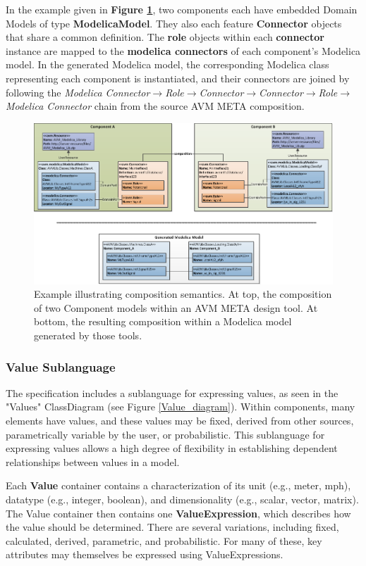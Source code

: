 In the example given in \textbf{Figure \ref{Composition_Example}}, two components each have embedded Domain Models of type \textbf{ModelicaModel}. They also each feature \textbf{Connector} objects that share a common definition. The \textbf{role} objects within each \textbf{connector} instance are mapped to the \textbf{modelica connectors} of each component's Modelica model. In the generated Modelica model, the corresponding Modelica class representing each component is instantiated, and their connectors are joined by following the \textit{ Modelica Connector$\rightarrow$Role$\rightarrow$Connector$\rightarrow$Connector$\rightarrow$Role$\rightarrow$Modelica Connector} chain from the source AVM META composition.

\begin{figure}
\includegraphics[width=\textwidth]{CompositionExample}
\caption{Example illustrating composition semantics. At top, the composition of two Component models within an AVM META design tool. At bottom, the resulting composition within a Modelica model generated by those tools.}
\label{Composition_Example}
\end{figure}

\subsubsection{Value Sublanguage}
The specification includes a sublanguage for expressing values, as seen in the "Values" ClassDiagram (see Figure \ref{Value_diagram}). Within components, many elements have values, and these values may be fixed, derived from other sources, parametrically variable by the user, or probabilistic. This sublanguage for expressing values allows a high degree of flexibility in establishing dependent relationships between values in a model.

Each \textbf{Value} container contains a characterization of its unit (e.g., meter, mph), datatype (e.g., integer, boolean), and dimensionality (e.g., scalar, vector, matrix). The Value container then contains one \textbf{ValueExpression}, which describes how the value should be determined. There are several variations, including fixed, calculated, derived, parametric, and probabilistic. For many of these, key attributes may themselves be expressed using ValueExpressions.


